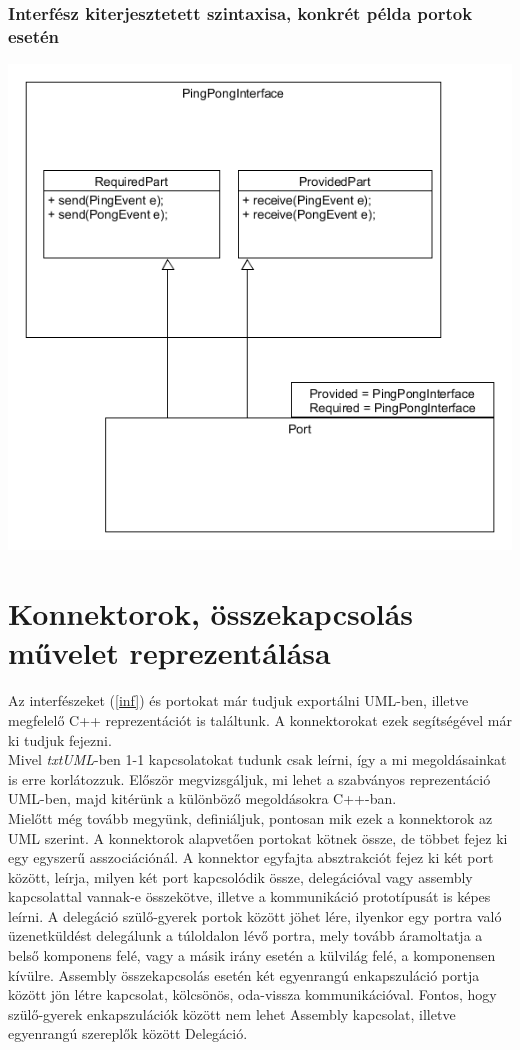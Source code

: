 \documentclass[a4paper,12pt]{report}
\begin{document}
\subsubsection{Interfész kiterjesztetett szintaxisa, konkrét példa portok esetén}
\includegraphics[scale=0.7]{seperate_inf.png} \\

\section{Konnektorok, összekapcsolás művelet reprezentálása} \label{connect}
Az interfészeket (\ref{inf}) és portokat már tudjuk exportálni UML-ben, illetve megfelelő C++ reprezentációt is találtunk. A konnektorokat ezek segítségével már ki tudjuk fejezni. \\
Mivel \textit{txtUML}-ben 1-1 kapcsolatokat tudunk csak leírni, így a mi megoldásainkat is erre korlátozzuk. Először megvizsgáljuk, mi lehet a szabványos reprezentáció UML-ben, majd kitérünk a különböző megoldásokra C++-ban. \\
Mielőtt még tovább megyünk, definiáljuk, pontosan mik ezek a konnektorok az UML szerint. A konnektorok alapvetően portokat kötnek össze, de többet fejez ki egy egyszerű asszociációnál. A konnektor egyfajta absztrakciót fejez ki két port között, leírja, milyen két port kapcsolódik össze, delegációval vagy assembly kapcsolattal vannak-e összekötve, illetve a kommunikáció prototípusát is képes leírni. A delegáció szülő-gyerek portok között jöhet lére, ilyenkor egy portra való üzenetküldést delegálunk a túloldalon lévő portra, mely tovább áramoltatja a belső komponens felé, vagy a másik irány esetén a külvilág felé, a komponensen kívülre. Assembly összekapcsolás esetén két egyenrangú enkapszuláció portja között jön létre kapcsolat, kölcsönös, oda-vissza kommunikációval. Fontos, hogy szülő-gyerek enkapszulációk között nem lehet Assembly kapcsolat, illetve egyenrangú szereplők között Delegáció.
\end{document}
